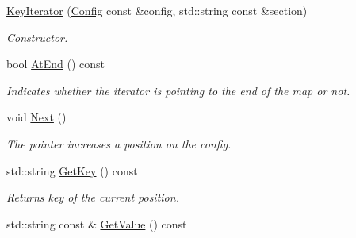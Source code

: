 \begin{DoxyCompactItemize}
\item 
\hypertarget{class_common_1_1_config_1_1_key_iterator_adaa4d99e98bfb25671086c090b079c23}{\hyperlink{class_common_1_1_config_1_1_key_iterator_adaa4d99e98bfb25671086c090b079c23}{Key\-Iterator} (\hyperlink{class_common_1_1_config}{Config} const \&config, std\-::string const \&section)}\label{class_common_1_1_config_1_1_key_iterator_adaa4d99e98bfb25671086c090b079c23}

\begin{DoxyCompactList}\small\item\em Constructor. \end{DoxyCompactList}\item 
\hypertarget{class_common_1_1_config_1_1_key_iterator_af24a3e94fd55dd118341ea681316357e}{bool \hyperlink{class_common_1_1_config_1_1_key_iterator_af24a3e94fd55dd118341ea681316357e}{At\-End} () const }\label{class_common_1_1_config_1_1_key_iterator_af24a3e94fd55dd118341ea681316357e}

\begin{DoxyCompactList}\small\item\em Indicates whether the iterator is pointing to the end of the map or not. \end{DoxyCompactList}\item 
\hypertarget{class_common_1_1_config_1_1_key_iterator_ae5db94c2dcb6af8eaca90d9d0dd4817b}{void \hyperlink{class_common_1_1_config_1_1_key_iterator_ae5db94c2dcb6af8eaca90d9d0dd4817b}{Next} ()}\label{class_common_1_1_config_1_1_key_iterator_ae5db94c2dcb6af8eaca90d9d0dd4817b}

\begin{DoxyCompactList}\small\item\em The pointer increases a position on the config. \end{DoxyCompactList}\item 
\hypertarget{class_common_1_1_config_1_1_key_iterator_a06d9d0caa42ec6ed9f3aa893b2292c7f}{std\-::string \hyperlink{class_common_1_1_config_1_1_key_iterator_a06d9d0caa42ec6ed9f3aa893b2292c7f}{Get\-Key} () const }\label{class_common_1_1_config_1_1_key_iterator_a06d9d0caa42ec6ed9f3aa893b2292c7f}

\begin{DoxyCompactList}\small\item\em Returns key of the current position. \end{DoxyCompactList}\item 
\hypertarget{class_common_1_1_config_1_1_key_iterator_aab4a93ab882fa45a803d9bc55203f071}{std\-::string const \& \hyperlink{class_common_1_1_config_1_1_key_iterator_aab4a93ab882fa45a803d9bc55203f071}{Get\-Value} () const }\label{class_common_1_1_config_1_1_key_iterator_aab4a93ab882fa45a803d9bc55203f071}


\end{DoxyCompactItemize}
